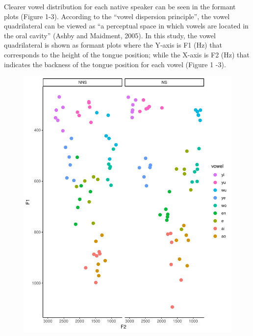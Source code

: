 \documentclass[man, fleqn, noextraspace]{apa6}
\begin{document}
Clearer vowel distribution for each native speaker can be seen in the
formant plots (Figure 1-3). According to the \enquote{vowel dispersion
principle}, the vowel quadrilateral can be viewed as \enquote{a
perceptual space in which vowels are located in the oral cavity} (Ashby
and Maidment, 2005). In this study, the vowel quadrilateral is shown as
formant plots where the Y-axis is F1 (Hz) that corresponds to the height
of the tongue position; while the X-axis is F2 (Hz) that indicates the
backness of the tongue position for each vowel (Figure 1 -3).

\begin{figure}
\centering
\includegraphics{Vowel_v2_files/figure-latex/figure1-1.pdf}
\caption{}
\end{figure}
\end{document}
